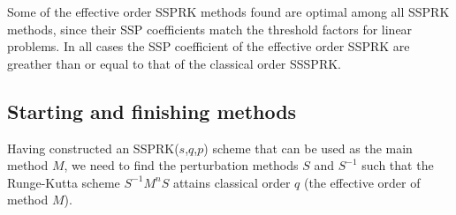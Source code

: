 




%
%


Some of the effective order SSPRK methods found are optimal among all SSPRK methods,
since their SSP coefficients match the threshold factors for linear problems.
In all cases the SSP coefficient of the effective order SSPRK are greather than or equal to that of the classical order SSSPRK.





\subsection{Starting and finishing methods}\label{subsection3.2}
Having constructed an SSPRK(\( s \),\( q \),\( p \)) scheme that can
be used as the main method \( M \), we need to find the perturbation
methods \( S \) and \( S^{-1} \) such that the Runge-Kutta scheme \(
S^{-1}M^{n}S \) attains classical order $q$ (the effective order of
method \( M \)).

